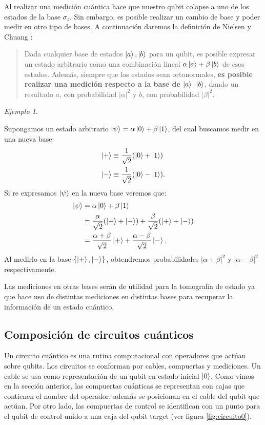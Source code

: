\documentclass[letterpaper,12pt]{thesisECFM}
\theoremstyle{plain}
\theoremstyle{definition}
\theoremstyle{definition}
\theoremstyle{remark}
\newcommand{\1}{\mathbb{1}}
\newtheorem{ex}{Ejemplo}[section]
\begin{document}
Al realizar una medición cuántica hace que nuestro qubit colapse a uno de los estados de la base $ \sigma_z$. Sin embargo, es posible realizar un cambio de base y poder medir en otro tipo de bases. A continuación daremos la definición de Nielsen y Chuang \cite{nielsen_chuang_2011}:
\begin{quote}
Dada cualquier base de estados $\ket{a},\ket{b}$ para un qubit, es posible expresar un estado arbitrario como una combinación lineal $\alpha\ket{a}+\beta\ket{b}$ de esos estados. Además, siempre que los estados sean ortonormales,  \textbf{es posible realizar una medición respecto a la base de $\ket{a},\ket{b}$}, dando un resultado $a$, con probabilidad $|\alpha|^2$ y $b$, con probabilidad $|\beta|^2$. 
\end{quote}

\begin{ex}\label{Ejemplo 2.1.1} \end{ex}
 Supongamos un estado arbitrario $\ket{\psi}=\alpha \ket{0} + \beta\ket{1}$, del cual buscamos medir en una nueva base:
 \begin{align}
 \label{ec:2.32}
     \ket{+} & \equiv \frac{1}{\sqrt{2}} (\ket{0} + \ket{1}) \\
    \ket{-} & \equiv \frac{1}{\sqrt{2}} (\ket{0}-\ket{1}).
 \end{align}
Si re expresamos $\ket{\psi}$ en la nueva base veremos que:
 \begin{align}
     \ket{\psi}  &= \alpha\ket{0} + \beta\ket{1} \\
                 &= \frac{\alpha}{\sqrt{2}} ( \ket{+ } + \ket{-}) + \frac{\beta}{\sqrt{2}} (\ket{+} + \ket{-})\\
                 & = \frac{\alpha+\beta}{\sqrt{2}} \ket{+} + \frac{\alpha-\beta}{\sqrt{2}} \ket{-} . 
 \end{align}
Al medirlo en la base $\{\ket{+}, \ket{-}\}$, obtendremos probabilidades $|\alpha+\beta|^2$ y $|\alpha-\beta|^2$ respectivamente.

Las mediciones en otras bases serán de utilidad para la tomografía de estado ya que hace uso de distintas mediciones en distintas bases para recuperar la información de un estado cuántico.
\subsection{Composición de circuitos cuánticos} %
Un circuito cuántico es una rutina computacional con operadores que actúan
sobre qubits. Los circuitos se conforman por cables, compuertas y mediciones.
Un cable se usa como representación de un qubit en estado inicial $\ket{0}$.  
Como vimos en la sección anterior, las compuertas cuánticas se representan con
cajas que contienen el nombre del operador, además se posicionan en el cable del qubit que actúan. Por otro lado, las compuertas de
control se identifican con un punto para el qubit de control unido a una caja
del qubit target (ver figura \ref{fig:circuito0}).
\end{document}
